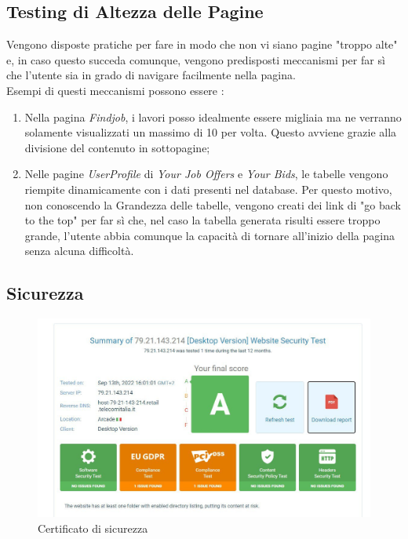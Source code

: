   \subsection{Testing di Altezza delle Pagine}
    Vengono disposte pratiche per fare in modo che non vi siano pagine "troppo alte" e, in caso questo succeda comunque, vengono predisposti meccanismi per far sì che l'utente sia in grado di navigare facilmente nella pagina. \\
    Esempi di questi meccanismi possono essere :
    \begin{enumerate}
      \item Nella pagina \textit{Findjob}, i lavori posso idealmente essere migliaia ma ne verranno solamente visualizzati un massimo di 10 per volta. Questo avviene grazie alla divisione del contenuto in sottopagine;
      \item Nelle pagine \textit{UserProfile} di \textit{Your Job Offers} e \textit{Your Bids}, le tabelle vengono riempite dinamicamente con i dati presenti nel database. Per questo motivo, non conoscendo la Grandezza
      delle tabelle, vengono creati dei link di "go back to the top" per far sì che, nel caso la tabella generata risulti essere troppo grande, l'utente abbia comunque la capacità di tornare all'inizio della pagina senza alcuna difficoltà.
    \end{enumerate}

  \subsection{Sicurezza}
  \begin{figure}[h]
    \includegraphics[scale=0.6]{Images/Sicurezza.jpg}
    \caption{Certificato di sicurezza}
    \centering
  \end{figure}

